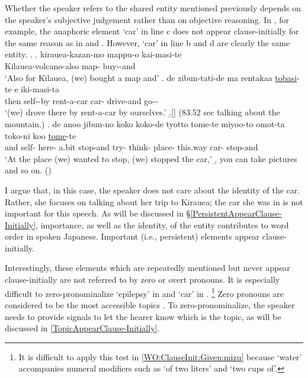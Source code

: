 Whether the speaker refers to the shared entity mentioned previously
depends on the speaker's subjective judgement rather than on objective reasoning.
In \Next, for example,
the anaphoric element  `car' in line c does not appear clause-initially for the same reason as in \LLast and \Last.
However,  `car' in line b and d are clearly the same entity.
%
\ex.\label{WO:ClauseInit:Given:kuruma}
 \ag. kirauea-kazan-mo mappu-o kai-masi-te \\
 		Kilauea-volcano-also map- buy--and \\
		`Also for Kilauea, (we) bought a map and'
 \bg. de zibun-tati-de ma rentakaa  \ul{tobasi}-te e iki-masi-ta \\
 		then self--by  rent-a-car car- drive-and  go-- \\
		`(we) drove there by rent-a-car by ourselves.'
 \b.[] (83.52 sec talking about the mountain.)
 \bg. de anoo jibun-no koko koko-de tyotto tome-te miyoo-to omot-ta toko-ni koo  \ul{tome}-te \\
 		and  self-  here- a.bit stop-and try- think- place- this.way car- stop-and \\
	 	`At the place (we) wanted to stop, (we) stopped the car,'
 \b. you can take pictures and so on.
 \hfill{()}
%

I argue that, in this case, the speaker does not care about the identity of the car.
Rather, she focuses on talking about her trip to Kirauea;
the car she was in is not important for this speech.
As will be discussed in \S \ref{PersistentAppearClause-Initially},
importance, as well as the identity, of the entity contributes to word order in spoken Japanese.
Important (i.e., persistent) elements appear clause-initially.

Interestingly,
these elements which are repeatedly mentioned but never appear clause-initially are not referred to by zero or overt pronouns.
It is especially difficult to zero-pronominalize  `epilepsy' in \LLast[b-f] and  `car' in \Last[d].%
 \footnote{
 It is difficult to apply this test in \ref{WO:ClauseInit:Given:mizu} because  `water' accompanies numeral modifiers such as 
 `of two liters' and `two cups of'.
 }
Zero pronouns are considered to be the most accessible topics \cite[17]{givon83}.
To zero-pronominalize,
the speaker needs to provide signals to let the hearer know which is the topic, as will be discussed in \ref{TopicAppearClause-Initially}.

